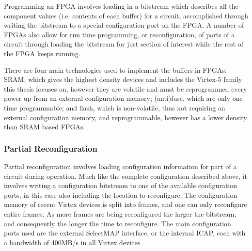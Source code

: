 \documentclass[12pt,final,oneside]{memoir} %
\begin{document}
Programming an \ac{FPGA} involves loading in a bitstream which describes all the component values (i.e. contents of each buffer) for a circuit, accomplished through writing the bitstream to a special configuration port on the \ac{FPGA}. A number of \acp{FPGA} also allow for run time programming, or reconfiguration, of parts of a circuit through loading the bitstream for just section of interest while the rest of the \ac{FPGA} keeps running.

There are four main technologies used to implement the buffers in \acp{FPGA}: \ac{SRAM}, which gives the highest density devices and includes the Virtex-5 family this thesis focuses on, however they are volatile and must be reprogrammed every power up from an external configuration memory; (anti)fuse, which are only one time programmable; and flash, which is non-volatile, thus not requiring an external configuration memory, and reprogrammable, however has a lower density than \ac{SRAM} based \acp{FPGA}\cite{FPGAArch}.

\subsubsection{Partial Reconfiguration}
Partial reconfiguration involves loading configuration information for part of a circuit during operation. Much like the complete configuration described above, it involves writing a configuration bitstream to one of the available configuration ports, in this case also including the location to reconfigure. The configuration memory of recent Virtex devices is split into frames, and one can only reconfigure entire frames. As more frames are being reconfigured the larger the bitstream, and consequently the longer the time to reconfigure. The main configuration ports used are the external SelectMAP interface, or the internal \ac{ICAP}, each with a bandwidth of 400MB/s in all Virtex devices \cite{XCell33,DiesselChange}
\end{document}
